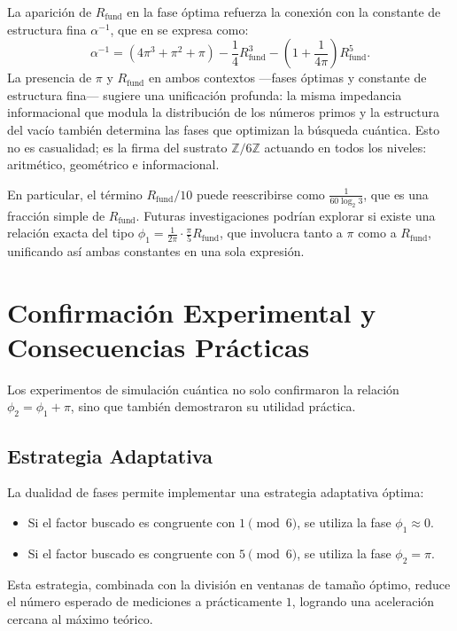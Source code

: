 \documentclass[12pt,a4paper]{article}
\theoremstyle{plain}
\theoremstyle{definition}
\theoremstyle{remark}
\newcommand{\Zmod}{\mathbb{Z}/6\mathbb{Z}}
\newcommand{\Rfund}{R_{\text{fund}}}
\newcommand{\Rfund}{R_{\text{fund}}}
\begin{document}
La aparición de $\Rfund$ en la fase óptima refuerza la conexión con la constante de estructura fina $\alpha^{-1}$, que en \cite{PeinadorGenesis} se expresa como:
\begin{equation}
\alpha^{-1} = (4\pi^3 + \pi^2 + \pi) - \frac{1}{4}\Rfund^3 - \left(1 + \frac{1}{4\pi}\right)\Rfund^5.
\end{equation}
La presencia de $\pi$ y $\Rfund$ en ambos contextos —fases óptimas y constante de estructura fina— sugiere una unificación profunda: la misma impedancia informacional que modula la distribución de los números primos y la estructura del vacío también determina las fases que optimizan la búsqueda cuántica. Esto no es casualidad; es la firma del sustrato $\Zmod$ actuando en todos los niveles: aritmético, geométrico e informacional.

En particular, el término $\Rfund/10$ puede reescribirse como $\frac{1}{60\log_2 3}$, que es una fracción simple de $\Rfund$. Futuras investigaciones podrían explorar si existe una relación exacta del tipo $\phi_1 = \frac{1}{2\pi}\cdot\frac{\pi}{5}\Rfund$, que involucra tanto a $\pi$ como a $\Rfund$, unificando así ambas constantes en una sola expresión.

\section{Confirmación Experimental y Consecuencias Prácticas}

Los experimentos de simulación cuántica no solo confirmaron la relación $\phi_2 = \phi_1 + \pi$, sino que también demostraron su utilidad práctica.

\subsection{Estrategia Adaptativa}

La dualidad de fases permite implementar una estrategia adaptativa óptima:

\begin{itemize}
\item Si el factor buscado es congruente con $1 \pmod 6$, se utiliza la fase $\phi_1 \approx 0$.
\item Si el factor buscado es congruente con $5 \pmod 6$, se utiliza la fase $\phi_2 = \pi$.
\end{itemize}

Esta estrategia, combinada con la división en ventanas de tamaño óptimo, reduce el número esperado de mediciones a prácticamente $1$, logrando una aceleración cercana al máximo teórico.
\end{document}
